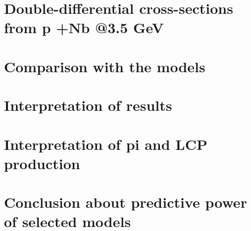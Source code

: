 \section{Double-differential cross-sections from p +Nb @3.5 GeV}
\section{Comparison with the models}
\section{Interpretation of results}
\section{Interpretation of pi and LCP production}
\section{Conclusion about predictive power of selected models}